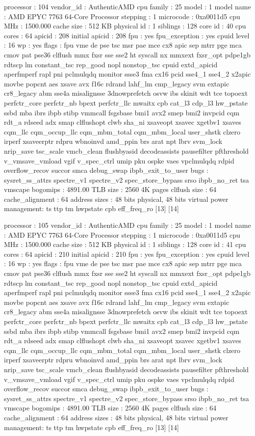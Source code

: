 processor	: 104
vendor_id	: AuthenticAMD
cpu family	: 25
model		: 1
model name	: AMD EPYC 7763 64-Core Processor
stepping	: 1
microcode	: 0xa0011d5
cpu MHz		: 1500.000
cache size	: 512 KB
physical id	: 1
siblings	: 128
core id		: 40
cpu cores	: 64
apicid		: 208
initial apicid	: 208
fpu		: yes
fpu_exception	: yes
cpuid level	: 16
wp		: yes
flags		: fpu vme de pse tsc msr pae mce cx8 apic sep mtrr pge mca cmov pat pse36 clflush mmx fxsr sse sse2 ht syscall nx mmxext fxsr_opt pdpe1gb rdtscp lm constant_tsc rep_good nopl nonstop_tsc cpuid extd_apicid aperfmperf rapl pni pclmulqdq monitor ssse3 fma cx16 pcid sse4_1 sse4_2 x2apic movbe popcnt aes xsave avx f16c rdrand lahf_lm cmp_legacy svm extapic cr8_legacy abm sse4a misalignsse 3dnowprefetch osvw ibs skinit wdt tce topoext perfctr_core perfctr_nb bpext perfctr_llc mwaitx cpb cat_l3 cdp_l3 hw_pstate ssbd mba ibrs ibpb stibp vmmcall fsgsbase bmi1 avx2 smep bmi2 invpcid cqm rdt_a rdseed adx smap clflushopt clwb sha_ni xsaveopt xsavec xgetbv1 xsaves cqm_llc cqm_occup_llc cqm_mbm_total cqm_mbm_local user_shstk clzero irperf xsaveerptr rdpru wbnoinvd amd_ppin brs arat npt lbrv svm_lock nrip_save tsc_scale vmcb_clean flushbyasid decodeassists pausefilter pfthreshold v_vmsave_vmload vgif v_spec_ctrl umip pku ospke vaes vpclmulqdq rdpid overflow_recov succor smca debug_swap ibpb_exit_to_user
bugs		: sysret_ss_attrs spectre_v1 spectre_v2 spec_store_bypass srso ibpb_no_ret tsa vmscape
bogomips	: 4891.00
TLB size	: 2560 4K pages
clflush size	: 64
cache_alignment	: 64
address sizes	: 48 bits physical, 48 bits virtual
power management: ts ttp tm hwpstate cpb eff_freq_ro [13] [14]

processor	: 105
vendor_id	: AuthenticAMD
cpu family	: 25
model		: 1
model name	: AMD EPYC 7763 64-Core Processor
stepping	: 1
microcode	: 0xa0011d5
cpu MHz		: 1500.000
cache size	: 512 KB
physical id	: 1
siblings	: 128
core id		: 41
cpu cores	: 64
apicid		: 210
initial apicid	: 210
fpu		: yes
fpu_exception	: yes
cpuid level	: 16
wp		: yes
flags		: fpu vme de pse tsc msr pae mce cx8 apic sep mtrr pge mca cmov pat pse36 clflush mmx fxsr sse sse2 ht syscall nx mmxext fxsr_opt pdpe1gb rdtscp lm constant_tsc rep_good nopl nonstop_tsc cpuid extd_apicid aperfmperf rapl pni pclmulqdq monitor ssse3 fma cx16 pcid sse4_1 sse4_2 x2apic movbe popcnt aes xsave avx f16c rdrand lahf_lm cmp_legacy svm extapic cr8_legacy abm sse4a misalignsse 3dnowprefetch osvw ibs skinit wdt tce topoext perfctr_core perfctr_nb bpext perfctr_llc mwaitx cpb cat_l3 cdp_l3 hw_pstate ssbd mba ibrs ibpb stibp vmmcall fsgsbase bmi1 avx2 smep bmi2 invpcid cqm rdt_a rdseed adx smap clflushopt clwb sha_ni xsaveopt xsavec xgetbv1 xsaves cqm_llc cqm_occup_llc cqm_mbm_total cqm_mbm_local user_shstk clzero irperf xsaveerptr rdpru wbnoinvd amd_ppin brs arat npt lbrv svm_lock nrip_save tsc_scale vmcb_clean flushbyasid decodeassists pausefilter pfthreshold v_vmsave_vmload vgif v_spec_ctrl umip pku ospke vaes vpclmulqdq rdpid overflow_recov succor smca debug_swap ibpb_exit_to_user
bugs		: sysret_ss_attrs spectre_v1 spectre_v2 spec_store_bypass srso ibpb_no_ret tsa vmscape
bogomips	: 4891.00
TLB size	: 2560 4K pages
clflush size	: 64
cache_alignment	: 64
address sizes	: 48 bits physical, 48 bits virtual
power management: ts ttp tm hwpstate cpb eff_freq_ro [13] [14]

